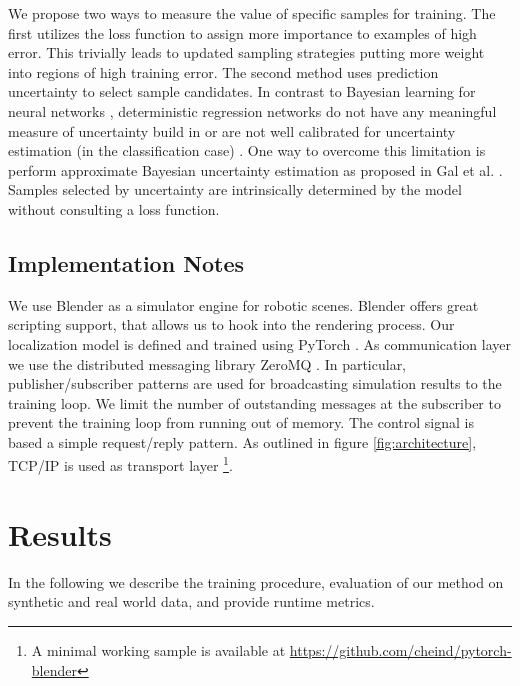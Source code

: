 \documentclass[conference]{IEEEtran}
\begin{document}
    We propose two ways to measure the value of specific samples for training. The first utilizes the loss function to assign more importance to examples of high error. This trivially leads to updated sampling strategies putting more weight into regions of high training error. The second method uses prediction uncertainty to select sample candidates. In contrast to Bayesian learning for neural networks \cite{neal2012bayesian}, deterministic regression networks do not have any meaningful measure of uncertainty build in or are not well calibrated for uncertainty estimation (in the classification case) \cite{guo2017calibration}. One way to overcome this limitation is perform approximate Bayesian uncertainty estimation as proposed in Gal et al. \cite{gal2015dropout}. Samples selected by uncertainty are intrinsically determined by the model without consulting a loss function.
    

\subsection{Implementation Notes}
    We use Blender \cite{blender} as a simulator engine for robotic scenes. Blender offers great scripting support, that allows us to hook into the rendering process. Our localization model is defined and trained using PyTorch \cite{paszke2017automatic}. As communication layer we use the distributed messaging library ZeroMQ \cite{zeromq_guide}. In particular, publisher/subscriber patterns are used for broadcasting simulation results to the training loop. We limit the number of outstanding messages at the subscriber to prevent the training loop from running out of memory. The control signal is based a simple request/reply pattern. As outlined in figure \ref{fig:architecture}, TCP/IP is used as transport layer \footnote{A minimal working sample is available at \url{https://github.com/cheind/pytorch-blender}}.

\section{Results}

    In the following we describe the training procedure, evaluation of our method on synthetic and real world data, and provide runtime metrics.
\end{document}
